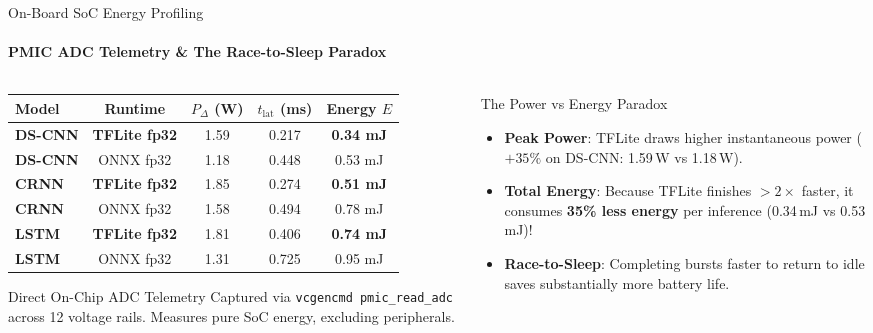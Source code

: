 \documentclass[aspectratio=169]{beamer}
\begin{document}
\begin{frame}{On-Board SoC Energy Profiling}
\framesubtitle{PMIC ADC Telemetry \& The Race-to-Sleep Paradox}
\begin{columns}[T]
  \begin{column}{0.48\textwidth}
    \begin{table}[h]
    \centering
    \scriptsize
    \setlength{\tabcolsep}{3pt}
    \begin{tabular}{lcccc}
    \toprule
    \textbf{Model} & \textbf{Runtime} & \textbf{$P_\Delta$ (W)} & \textbf{$t_\text{lat}$ (ms)} & \textbf{Energy $E$} \\
    \midrule
    \textbf{DS-CNN} & \textbf{TFLite fp32} & 1.59 & 0.217 & \textbf{0.34 mJ} \\
    \textbf{DS-CNN} & ONNX fp32   & 1.18 & 0.448 & 0.53 mJ \\
    \midrule
    \textbf{CRNN}   & \textbf{TFLite fp32} & 1.85 & 0.274 & \textbf{0.51 mJ} \\
    \textbf{CRNN}   & ONNX fp32   & 1.58 & 0.494 & 0.78 mJ \\
    \midrule
    \textbf{LSTM}   & \textbf{TFLite fp32} & 1.81 & 0.406 & \textbf{0.74 mJ} \\
    \textbf{LSTM}   & ONNX fp32   & 1.31 & 0.725 & 0.95 mJ \\
    \bottomrule
    \end{tabular}
    \end{table}

    \begin{block}{Direct On-Chip ADC Telemetry}
      \small Captured via \texttt{vcgencmd pmic\_read\_adc} across 12 voltage rails. Measures pure SoC energy, excluding peripherals.
    \end{block}
  \end{column}

  \begin{column}{0.48\textwidth}
    \begin{exampleblock}{The Power vs Energy Paradox}
      \begin{itemize}\small
        \item \textbf{Peak Power}: TFLite draws higher instantaneous power ($+35\%$ on DS-CNN: 1.59\,W vs 1.18\,W).
        \item \textbf{Total Energy}: Because TFLite finishes $>2\times$ faster, it consumes \textbf{35\% less energy} per inference (0.34\,mJ vs 0.53\,mJ)!
        \item \textbf{Race-to-Sleep}: Completing bursts faster to return to idle saves substantially more battery life.
      \end{itemize}
    \end{exampleblock}
  \end{column}
\end{columns}
\end{frame}
\end{document}
